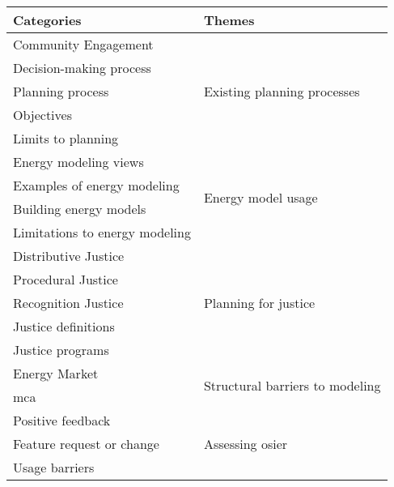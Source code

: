 \begin{tabular}{ll}
    \toprule
    Categories & Themes \\
    \midrule
    Community Engagement&\multirow{5}{*}{Existing planning processes}\\
    Decision-making process&\\
    Planning process&\\
    Objectives&\\
    Limits to planning&\\
    \midrule
    Energy modeling views&\multirow{4}{*}{Energy model usage}\\
    Examples of energy modeling&\\
    Building energy models&\\
    Limitations to energy modeling&\\
    \midrule
    Distributive Justice&\multirow{5}{*}{Planning for justice}\\
    Procedural Justice&\\
    Recognition Justice&\\
    Justice definitions&\\
    Justice programs&\\
    \midrule
    Energy Market&\multirow{2}{*}{Structural barriers to modeling}\\
    \Acl{mca}&\\
    \midrule
    Positive feedback&\multirow{3}{*}{Assessing \ac{osier}}\\
    Feature request or change&\\
    Usage barriers&\\
    \bottomrule
\end{tabular}